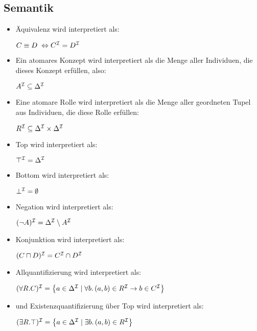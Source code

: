 \documentclass[runningheads,a4paper]{llncs}
\begin{document}
\subsection{Semantik}

\begin{itemize}
	\item[] Äquivalenz wird interpretiert als:
		\begin{center}
		$C\equiv D\;\Leftrightarrow C^{\cal I}=D^{\cal I}$
		\end{center}
	\item[] Ein atomares Konzept wird interpretiert als die Menge aller Individuen, die dieses Konzept erfüllen, also:
		\begin{center}
		 $A^{\cal I}\subseteq \Delta^{\cal I}$
		\end{center}
	\item[] Eine atomare Rolle wird interpretiert als die Menge aller geordneten Tupel aus Individuen, die diese Rolle erfüllen:
		\begin{center}
		  $R^{\cal I}\subseteq \Delta^{\cal I}\times \Delta^{\cal I}$
		\end{center}
	\item[] Top wird interpretiert als:
		\begin{center}
		$\top^{\cal I}=\Delta^{\cal I}$
		\end{center}
	\item[] Bottom wird interpretiert als:
		\begin{center}
		$\bot^{\cal I}=\emptyset$
		\end{center}
	\item[] Negation wird interpretiert als:
		\begin{center}
		$(\neg A)^{\cal I} = \Delta^{\cal I}\setminus A^{\cal I}$
		\end{center}
	\item[] Konjunktion wird interpretiert als:
		\begin{center}
		$ (C \sqcap D)^{\cal I}=C^{\cal I}\cap D^{\cal I}  $
		\end{center}
	\item[] Allquantifizierung wird interpretiert als:
		\begin{center}
		$(\forall R.C)^{\cal I}=\left\{a\in \Delta^{\cal I}\;|\;\forall b.\,(a,b)\in R^{\cal I}\rightarrow b\in C^{\cal I}\right\}$
		\end{center}
	\item[] und Existenzquantifizierung über Top wird interpretiert als:
		\begin{center}
		$(\exists R.\top)^{\cal I}=\left\{a\in \Delta^{\cal I}\;|\;\exists b.\,(a,b)\in R^{\cal I}\right\}$
		\end{center}
\end{itemize}
\end{document}

